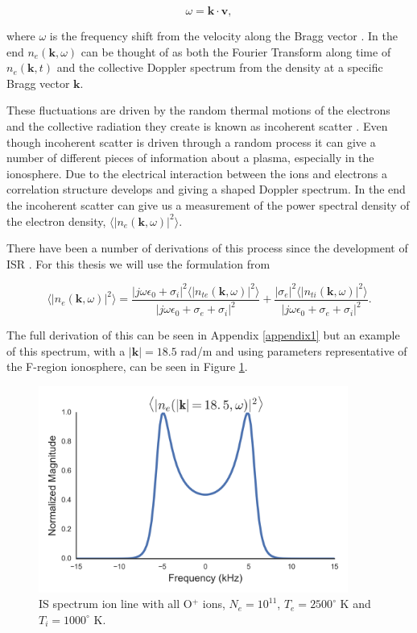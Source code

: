 \begin{equation}
\label{eqn:dop1}
\omega=\mathbf{k} \cdot \mathbf{v},
\end{equation}

\noindent where $\omega$ is the frequency shift from the velocity along the Bragg vector \cite{sheffield2010}. In the end $n_e(\mathbf{k}, \omega)$ can be thought of as both the Fourier Transform along time of $n_e(\mathbf{k},t)$ and the collective Doppler spectrum from the density at a specific Bragg vector $\mathbf{k}$.

These fluctuations are driven by the random thermal motions of the electrons and the collective radiation they create is known as incoherent scatter \cite{kudeki:milla:1}. Even though incoherent scatter is driven through a random process it can give a number of different pieces of information about a plasma, especially in the ionosphere. Due to the electrical interaction between the ions and electrons a correlation structure develops and giving a shaped Doppler spectrum. In the end the incoherent scatter can give us a measurement of the power spectral density of the electron density, $\langle \left|n_e(\mathbf{k},\omega)\right|^2\rangle$.

There have been a number of derivations of this process since the development of ISR \cite{dougherty:farley1960,farleydougherty:ISR2,doughteryfarley:ISR3,hagfors1961}. For this thesis we will use the formulation from  \cite{kudeki:milla:1,kudeki:milla:2,Kudeki:2006kx}


\begin{equation}
\label{eq:mainspeceq:body}
\langle \left|n_e(\mathbf{k},\omega)\right|^2\rangle = \frac{|j\omega\epsilon_0 + \sigma_i|^2 \langle |n_{te}(\mathbf{k},\omega)|^2\rangle}{|j\omega\epsilon_0 +\sigma_e+\sigma_i|^2} + \frac{| \sigma_e|^2 \langle |n_{ti}(\mathbf{k},\omega)|^2\rangle}{|j\omega\epsilon_0 +\sigma_e+\sigma_i|^2}.
\end{equation}

\noindent The full derivation of this can be seen in Appendix \ref{appendix1} but an example of this spectrum, with a $|\mathbf{k}|=18.5$ rad/m and using parameters representative of the F-region ionosphere, can be seen in Figure \ref{fig:ispecch2}. 

\begin{figure}[!t]
\centering
\includegraphics[width=4in]{Specion}
\caption{IS spectrum ion line with all O$^+$ ions, $N_e = 10^{11}$, $T_e=2500 ^\circ$ K and $T_i=1000 ^\circ$ K. }
\label{fig:ispecch2}
\end{figure}

